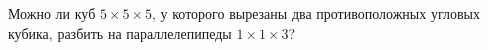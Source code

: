 Можно ли куб $5 \times 5 \times 5$, у которого вырезаны два противоположных угловых кубика, разбить на параллелепипеды $1 \times 1 \times 3$?